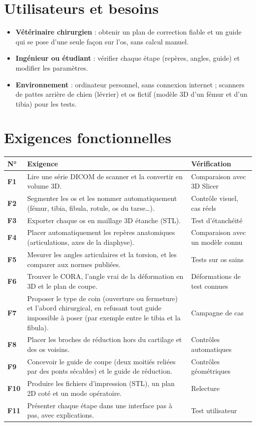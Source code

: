 \documentclass[11pt,a4paper]{article}
\newcommand{\exigence}[3]{\textbf{#1} & #2 & #3 \\ \midrule}
\begin{document}
\section{Utilisateurs et besoins}

\begin{itemize}
  \item \textbf{Vétérinaire chirurgien} : obtenir un plan de correction fiable et un guide qui se pose d'une seule
        façon sur l'os, sans calcul manuel.
  \item \textbf{Ingénieur ou étudiant} : vérifier chaque étape (repères, angles, guide) et modifier les paramètres.
  \item \textbf{Environnement} : ordinateur personnel, sans connexion internet ; scanners de pattes arrière de chien
        (lévrier) et os fictif (modèle 3D d'un fémur et d'un tibia) pour les tests.
\end{itemize}

\section{Exigences fonctionnelles}

\begin{longtable}{@{}p{1.1cm}p{9.6cm}p{4.3cm}@{}}
\toprule
\textbf{N°} & \textbf{Exigence} & \textbf{Vérification} \\ \midrule \endhead
\exigence{F1}{Lire une série DICOM de scanner et la convertir en volume 3D.}{Comparaison avec 3D Slicer}
\exigence{F2}{Segmenter les os et les nommer automatiquement (fémur, tibia, fibula, rotule, os du tarse\ldots).}{Contrôle visuel, cas réels}
\exigence{F3}{Exporter chaque os en maillage 3D étanche (STL).}{Test d'étanchéité}
\exigence{F4}{Placer automatiquement les repères anatomiques (articulations, axes de la diaphyse).}{Comparaison avec un modèle connu}
\exigence{F5}{Mesurer les angles articulaires et la torsion, et les comparer aux normes publiées.}{Tests sur os sains}
\exigence{F6}{Trouver le CORA, l'angle vrai de la déformation en 3D et le plan de coupe.}{Déformations de test connues}
\exigence{F7}{Proposer le type de coin (ouverture ou fermeture) et l'abord chirurgical, en refusant tout guide impossible à poser (par exemple entre le tibia et la fibula).}{Campagne de cas}
\exigence{F8}{Placer les broches de réduction hors du cartilage et des os voisins.}{Contrôles automatiques}
\exigence{F9}{Concevoir le guide de coupe (deux moitiés reliées par des ponts sécables) et le guide de réduction.}{Contrôles géométriques}
\exigence{F10}{Produire les fichiers d'impression (STL), un plan 2D coté et un mode opératoire.}{Relecture}
\exigence{F11}{Présenter chaque étape dans une interface pas à pas, avec explications.}{Test utilisateur}
\bottomrule
\end{longtable}
\addtocounter{table}{-1} %
\end{document}
